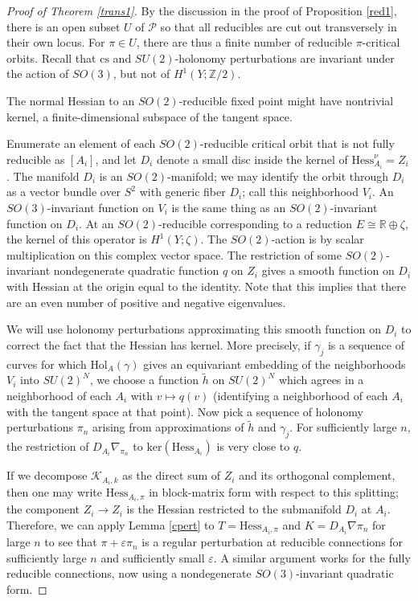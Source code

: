 \documentclass{memo-l}
\theoremstyle{definition}
\theoremstyle{remark}
\numberwithin{section}{chapter}
\numberwithin{equation}{chapter}
\begin{document}
\begin{proof}[Proof of Theorem \ref{trans1}]By the discussion in the proof of Proposition \ref{red1}, there is an open subset $U$ of $\mathcal P$ so that all reducibles are cut out transversely in their own locus. For $\pi \in U$, there are thus a finite number of reducible $\pi$-critical orbits. Recall that $\text{cs}$ and $SU(2)$-holonomy perturbations are invariant under the action of $SO(3)$, but not of $H^1(Y;\mathbb Z/2)$. 

The normal Hessian to an $SO(2)$-reducible fixed point might have nontrivial kernel, a finite-dimensional subspace of the tangent space. 

Enumerate an element of each $SO(2)$-reducible critical orbit that is not fully reducible as $[A_i]$, and let $D_i$ denote a small disc inside the kernel of $\text{Hess}^\nu_{A_i} = Z_i$. The manifold $D_i$ is an $SO(2)$-manifold; we may identify the orbit through $D_i$ as a vector bundle over $S^2$ with generic fiber $D_i$; call this neighborhood $V_i$. An $SO(3)$-invariant function on $V_i$ is the same thing as an $SO(2)$-invariant function on $D_i$. At an $SO(2)$-reducible corresponding to a reduction $E \cong \mathbb R \oplus \zeta$, the kernel of this operator is $H^1(Y;\zeta)$. The $SO(2)$-action is by scalar multiplication on this complex vector space. The restriction of some $SO(2)$-invariant nondegenerate quadratic function $q$ on $Z_i$ gives a smooth function on $D_i$ with Hessian at the origin equal to the identity. Note that this implies that there are an even number of positive and negative eigenvalues. 

We will use holonomy perturbations approximating this smooth function on $D_i$ to correct the fact that the Hessian has kernel. More precisely, if $\gamma_j$ is a sequence of curves for which $\text{Hol}_A(\gamma)$ gives an equivariant embedding of the neighborhoods $V_i$ into $SU(2)^N$, we choose a function $\tilde h$ on $SU(2)^N$ which agrees in a neighborhood of each $A_i$ with $v \mapsto q(v)$ (identifying a neighborhood of each $A_i$ with the tangent space at that point). Now pick a sequence of holonomy perturbations $\pi_n$ arising from approximations of $\tilde h$ and $\gamma_j$. For sufficiently large $n$, the restriction of $D_{A_i}\nabla_{\pi_n}$ to $\text{ker}(\text{Hess}_{A_i})$ is very close to $q$.

If we decompose $\mathcal K_{A_i,k}$ as the direct sum of $Z_i$ and its orthogonal complement, then one may write $\text{Hess}_{A_i, \pi}$ in block-matrix form with respect to this splitting; the component $Z_i \to Z_i$ is the Hessian restricted to the submanifold $D_i$ at $A_i$. Therefore, we can apply Lemma \ref{cpert} to $T = \text{Hess}_{A_i,\pi}$ and $K = D_{A_i}\nabla \pi_n$ for large $n$ to see that $\pi+\varepsilon \pi_n$ is a regular perturbation at reducible connections for sufficiently large $n$ and sufficiently small $\varepsilon$. A similar argument works for the fully reducible connections, now using a nondegenerate $SO(3)$-invariant quadratic form.


\end{proof}
\end{document}
